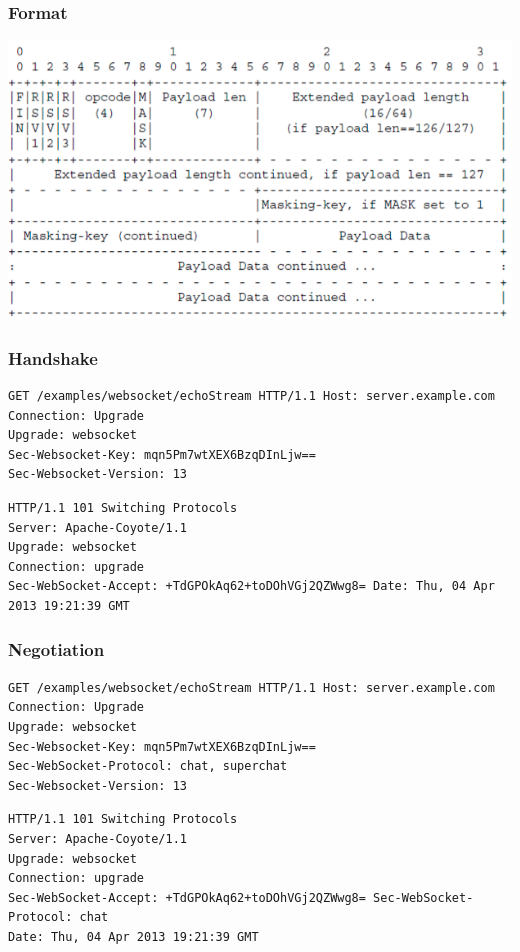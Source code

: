 \documentclass[10pt]{article}
\begin{document}
\subsubsection{Format}
\begin{center}
	\includegraphics[scale=0.3]{websocket-spec-format.png}
\end{center}
\subsubsection{Handshake}
\begin{lstlisting}
GET /examples/websocket/echoStream HTTP/1.1 Host: server.example.com
Connection: Upgrade
Upgrade: websocket
Sec-Websocket-Key: mqn5Pm7wtXEX6BzqDInLjw==
Sec-Websocket-Version: 13
\end{lstlisting}
\begin{lstlisting}
HTTP/1.1 101 Switching Protocols
Server: Apache-Coyote/1.1
Upgrade: websocket
Connection: upgrade
Sec-WebSocket-Accept: +TdGPOkAq62+toDOhVGj2QZWwg8= Date: Thu, 04 Apr 2013 19:21:39 GMT
\end{lstlisting}
\subsubsection{Negotiation}
\begin{lstlisting}
GET /examples/websocket/echoStream HTTP/1.1 Host: server.example.com
Connection: Upgrade
Upgrade: websocket
Sec-Websocket-Key: mqn5Pm7wtXEX6BzqDInLjw==
Sec-WebSocket-Protocol: chat, superchat
Sec-Websocket-Version: 13
\end{lstlisting}
\begin{lstlisting}
HTTP/1.1 101 Switching Protocols
Server: Apache-Coyote/1.1
Upgrade: websocket
Connection: upgrade
Sec-WebSocket-Accept: +TdGPOkAq62+toDOhVGj2QZWwg8= Sec-WebSocket-Protocol: chat
Date: Thu, 04 Apr 2013 19:21:39 GMT
\end{lstlisting}
\end{document}
